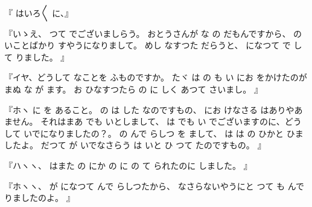 
『
はいろ〳〵
に、』

『いゝえ、
つて
でございましらう。
おとうさんが
な
の
だもんですから、
の
いことばかり
すやうになりまして。
めし
なすつた
だらうと、
になつて
で
して
りました。
』

『イヤ、どうして
なことを
ふものですか。
たヾ
は
の
も
い
にお
をかけたのが
まぬ
な
が
ます。
お
ひなすつたら
の
に
しく
あつて
さいまし。
』

『ホヽ
に
を
あること。
の
は
した
なのですもの、
にお
けなさる
はありやあ
ません。
それはまあ
でも
いとしまして、
は
でも
い
でございますのに、どうして
いでになりましたの？。
の
んで
らしつ
を
まして、
は
は
の
ひかと
ひましたよ。
だつて
が
いでなさらう
は
いと
ひ
つて
たのですもの。
』

『ハヽヽ、
はまた
の
にか
の
に
の
て
られたのに
しました。
』

『ホヽヽ、
が
になつて
んで
らしつたから、
なさらないやうにと
つて
も
んで
りましたのよ。
』

